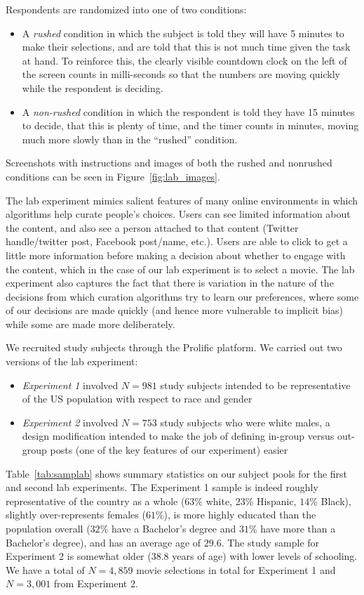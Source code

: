 \documentclass[12pt,letterpaper]{article}
\begin{document}
Respondents are randomized into one of two conditions: 
\begin{itemize}
    \item A \textit{rushed} condition in which the subject is told they will have 5 minutes to make their selections, and are told that this is not much time given the task at hand. To reinforce this, the clearly visible countdown clock on the left of the screen counts in milli-seconds so that the numbers are moving quickly while the respondent is deciding.
    \item A \textit{non-rushed} condition in which the respondent is told they have 15 minutes to decide, that this is plenty of time, and the timer counts in minutes, moving much more slowly than in the ``rushed'' condition.
\end{itemize}
Screenshots with instructions and images of both the rushed and nonrushed conditions can be seen in Figure~\ref{fig:lab_images}.

The lab experiment mimics salient features of many online environments in which algorithms help curate people's choices. Users can see limited information about the content, and also see a person attached to that content (Twitter handle/twitter post, Facebook post/name, etc.). Users are able to click to get a little more information before making a decision about whether to engage with the content, which in the case of our lab experiment is to select a movie. The lab experiment also captures the fact that there is variation in the nature of the decisions from which curation algorithms try to learn our preferences, where some of our decisions are made quickly (and hence more vulnerable to implicit bias) while some are made more deliberately.

We recruited study subjects through the Prolific platform. We carried out two versions of the lab experiment:
\begin{itemize}
    \item \textit{Experiment 1} involved $N=981$ study subjects intended to be representative of the US population with respect to race and gender
    \item \textit{Experiment 2} involved $N=753$ study subjects who were white males, a design modification intended to make the job of defining in-group versus out-group posts (one of the key features of our experiment) easier
\end{itemize}
Table~\ref{tab:samplab} shows summary statistics on our subject pools for the first and second lab experiments. The Experiment 1 sample is indeed roughly representative of the country as a whole ($63\%$ white, $23\%$ Hispanic, $14\%$ Black), slightly over-represents females ($61\%$), is more highly educated than the population overall ($32\%$ have a Bachelor's degree and $31\%$ have more than a Bachelor's degree), and has an average age of $29.6$. The study sample for Experiment 2 is somewhat older ($38.8$ years of age) with lower levels of schooling. We have a total of $N=4,859$ movie selections in total for Experiment 1 and $N=3,001$ from Experiment 2. 
\end{document}
